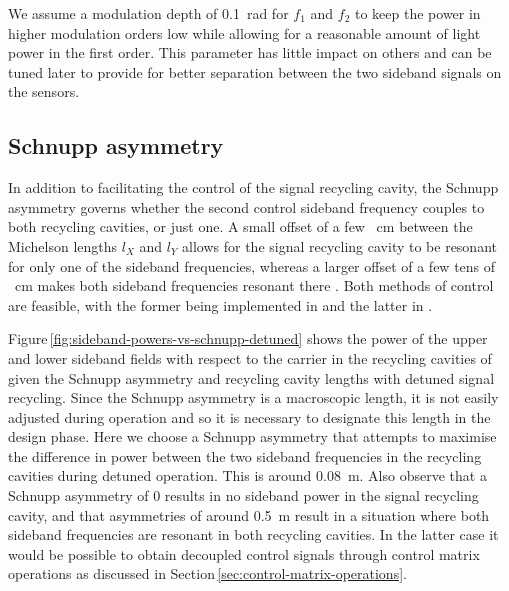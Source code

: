 We assume a modulation depth of \SI{0.1}{\radian} for $f_1$ and $f_2$ to keep the power in higher modulation orders low while allowing for a reasonable amount of light power in the first order. This parameter has little impact on others and can be tuned later to provide for better separation between the two sideband signals on the sensors.

\subsection{Schnupp asymmetry}
In addition to facilitating the control of the signal recycling cavity, the Schnupp asymmetry governs whether the second control sideband frequency couples to both recycling cavities, or just one. A small offset of a few \SI{}{\centi\meter} between the Michelson lengths $l_X$ and $l_Y$ allows for the signal recycling cavity to be resonant for only one of the sideband frequencies, whereas a larger offset of a few tens of \SI{}{\centi\meter} makes both sideband frequencies resonant there \cite{Vajente2008}. Both methods of control are feasible, with the former being implemented in \ALIGO{} \cite{Abbott2010} and the latter in \KAGRA{} \cite{kagra2013}.

Figure\,\ref{fig:sideband-powers-vs-schnupp-detuned} shows the power of the upper and lower sideband fields with respect to the carrier in the recycling cavities of \ETLF{} given the Schnupp asymmetry and recycling cavity lengths with detuned signal recycling. Since the Schnupp asymmetry is a macroscopic length, it is not easily adjusted during operation and so it is necessary to designate this length in the design phase. Here we choose a Schnupp asymmetry that attempts to maximise the difference in power between the two sideband frequencies in the recycling cavities during detuned operation. This is around \SI{0.08}{\meter}. Also observe that a Schnupp asymmetry of \num{0} results in no sideband power in the signal recycling cavity, and that asymmetries of around \SI{0.5}{\meter} result in a situation where both sideband frequencies are resonant in both recycling cavities. In the latter case it would be possible to obtain decoupled control signals through control matrix operations as discussed in Section\,\ref{sec:control-matrix-operations}.

